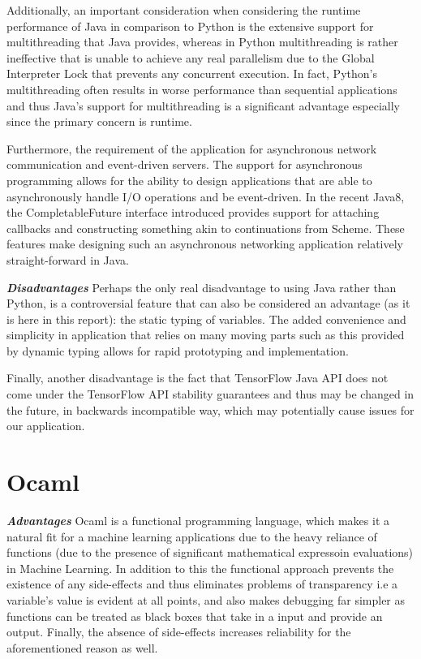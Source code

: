\noindent Additionally, an important consideration when considering the runtime performance of Java in comparison to Python is the extensive support for multithreading that Java provides, whereas in Python multithreading is rather ineffective that is unable to achieve any real parallelism due to the Global Interpreter Lock that prevents any concurrent execution. In fact, Python's multithreading often results in worse performance than sequential applications and thus Java's support for multithreading is a significant advantage especially since the primary concern is runtime. \newline

\noindent Furthermore, the requirement of the application for asynchronous network communication and event-driven servers. The support for asynchronous programming allows for the ability to design applications that are able to asynchronously handle I/O operations and be event-driven. In the recent Java8, the CompletableFuture interface introduced provides support for attaching callbacks and constructing something akin to continuations from Scheme. These features make designing such an asynchronous networking application relatively straight-forward in Java.\newline

\noindent \textbf{\textit{Disadvantages}}\newline
\noindent Perhaps the only real disadvantage to using Java rather than Python, is a controversial feature that can also be considered an advantage (as it is here in this report): the static typing of variables. The added convenience and simplicity in application that relies on many moving parts such as this provided by dynamic typing allows for rapid prototyping and implementation.\newline

\noindent Finally, another disadvantage is the fact that TensorFlow Java API does not come under the TensorFlow API stability guarantees and thus may be changed in the future, in backwards incompatible way, which may potentially cause issues for our application.  

\section{Ocaml}

\textbf{\textit{Advantages}}\newline
Ocaml is a functional programming language, which makes it a natural fit for a machine learning applications due to the heavy reliance of functions (due to the presence of significant mathematical expressoin evaluations) in Machine Learning. In addition to this the functional approach prevents the existence of any side-effects and thus eliminates problems of transparency i.e a variable's value is evident at all points, and also makes debugging far simpler as functions can be treated as black boxes that take in a input and provide an output. Finally, the absence of side-effects increases reliability for the aforementioned reason as well. \newline

